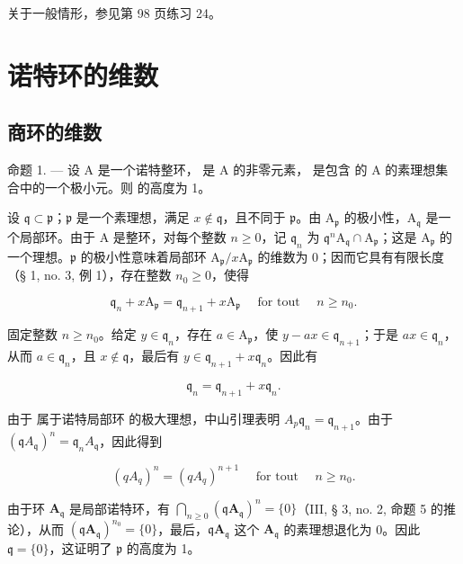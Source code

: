 关于一般情形，参见第 98 页练习 24。

\section{诺特环的维数}

\subsection{商环的维数}

命题 1. --- 设 A 是一个诺特整环，  是 A 的非零元素，  是包含  的 A 的素理想集合中的一个极小元。则  的高度为 1。

设 \(\mathfrak{q} \subset \mathfrak{p}\)；\(\mathfrak{p}\) 是一个素理想，满足 \(x \notin \mathfrak{q}\)，且不同于 \(\mathfrak{p}\)。由 \(\mathrm{A}_{\mathfrak{p}}\) 的极小性，\(\mathrm{A}_{\mathfrak{q}}\) 是一个局部环。由于 A 是整环，对每个整数 \(n \geqslant 0\)，记 \(\mathfrak{q}_n\) 为 \(\mathfrak{q}^n\mathrm{A}_{\mathfrak{q}} \cap \mathrm{A}_{\mathfrak{p}}\)；这是 \(\mathrm{A}_{\mathfrak{p}}\) 的一个理想。\(\mathfrak{p}\) 的极小性意味着局部环 \(\mathrm{A}_{\mathfrak{p}} / x\mathrm{A}_{\mathfrak{p}}\) 的维数为 0；因而它具有有限长度（§ 1, no. 3, 例 1），存在整数 \(n_0 \geqslant 0\)，使得

\[
\mathfrak {q} _ {n} + x \mathrm{A} _ {\mathfrak {p}} = \mathfrak {q} _ {n + 1} + x \mathrm{A} _ {\mathfrak {p}} \quad \text { for   tout } \quad n \geqslant n _ {0}.\tag{1}
\]

固定整数 \(n \geqslant n_{0}\)。给定 \(y \in \mathfrak{q}_{n}\)，存在 \(a \in \mathrm{A}_{\mathfrak{p}}\)，使 \(y - ax \in \mathfrak{q}_{n+1}\)；于是 \(ax \in \mathfrak{q}_{n}\)，从而 \(a \in \mathfrak{q}_{n}\)，且 \(x \notin \mathfrak{q}\)，最后有 \(y \in \mathfrak{q}_{n+1} + x\mathfrak{q}_{n}\)。因此有

\[
\mathfrak {q} _ {n} = \mathfrak {q} _ {n + 1} + x \mathfrak {q} _ {n}.\tag{2}
\]

由于  属于诺特局部环  的极大理想，中山引理表明 \(A_{p}\)\(\mathfrak{q}_n = \mathfrak{q}_{n+1}\)。由于 \((\mathfrak{q}A_{\mathfrak{q}})^{n} = \mathfrak{q}_{n}A_{\mathfrak{q}}\)，因此得到

\[
(q A _ {q}) ^ {n} = (q A _ {q}) ^ {n + 1} \quad \text { for   tout } \quad n \geqslant n _ {0}.\tag{3}
\]

由于环 \(\mathbf{A}_{\mathfrak{q}}\) 是局部诺特环，有 \(\bigcap_{n\geqslant 0}(\mathfrak{q}\mathbf{A}_{\mathfrak{q}})^n = \{0\}\)（III, § 3, no. 2, 命题 5 的推论），从而 \((\mathfrak{q}\mathbf{A}_{\mathfrak{q}})^{n_0} = \{0\}\)，最后，\(\mathfrak{q}\mathbf{A}_{\mathfrak{q}}\) 这个 \(\mathbf{A}_{\mathfrak{q}}\) 的素理想退化为 0。因此 \(\mathfrak{q} = \{0\}\)，这证明了 \(\mathfrak{p}\) 的高度为 1。

